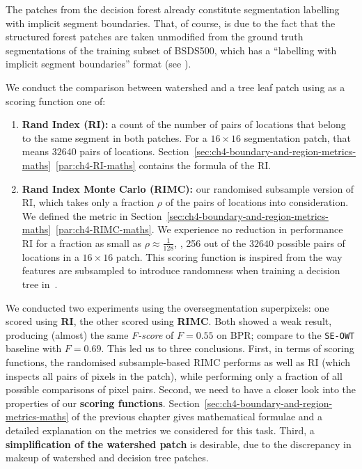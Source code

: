 The patches from the decision forest already constitute segmentation labelling with implicit segment boundaries. That, of course, is due to the fact that the structured forest patches are taken unmodified from the ground truth segmentations of the training subset of BSDS500, which has a ``labelling with implicit segment boundaries'' format (see ). 

We conduct the comparison between watershed and a tree leaf patch using as a scoring function one of:

\begin{enumerate}
 \item{\bf Rand Index (RI):} a count of the number of pairs of locations that belong to the same segment in both patches. For a $16\times16$ segmentation patch, that means $32 640$ pairs of locations. Section~\ref*{sec:ch4-boundary-and-region-metrics-maths}~\ref{par:ch4-RI-maths} contains the formula of the RI.
 \item{\bf Rand Index Monte Carlo (RIMC):} our randomised subsample version of RI, which takes only a fraction $\rho$ of the pairs of locations into consideration. We defined %
 the metric in Section~\ref*{sec:ch4-boundary-and-region-metrics-maths}~\ref{par:ch4-RIMC-maths}. We experience no reduction in performance \wrt RI for a fraction as small as $\rho\approx\frac{1}{128}$, \ie, 256 out of the $32 640$ possible pairs of locations in a $16 \times 16$ patch. This scoring function is inspired from the way features are subsampled to introduce randomness when training a decision tree in~\cite{DollarICCV13edges,Dollar2013toolbox}.
\end{enumerate}

We conducted two experiments using the oversegmentation superpixels: one scored using {\bf RI}, the other scored using {\bf RIMC}. Both showed a weak result, producing (almost) the same {\it F-score} of $F=0.55$ on BPR; compare to the {\tt SE-OWT} baseline with $F=0.69$. This led us to three conclusions. First, in terms of scoring functions, the randomised subsample-based RIMC performs as well as RI (which inspects all pairs of pixels in the patch), while performing only a fraction of all possible comparisons of pixel pairs. Second, we need to have a closer look into the properties of our \textbf{scoring functions}. Section~\ref{sec:ch4-boundary-and-region-metrics-maths} of the previous chapter gives mathematical formulae and a detailed explanation on the metrics we considered for this task. Third, a \textbf{simplification of the watershed patch} is desirable, due to the discrepancy %
in makeup %
of watershed and decision tree patches.


